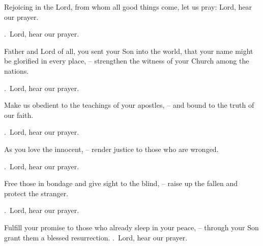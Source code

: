 \lettrine[loversize=0.15,lines=2]{R}{}ejoicing in the Lord, from whom all good things come, let us pray: Lord, hear our prayer.
\par \Rbar.~Lord, hear our prayer.

Father and Lord of all, you sent your Son into the world, that your name might be glorified in every place,
– strengthen the witness of your Church among the nations.
\par \Rbar.~Lord, hear our prayer.

Make us obedient to the teachings of your apostles,
– and bound to the truth of our faith.
\par \Rbar.~Lord, hear our prayer.

As you love the innocent,
– render justice to those who are wronged.
\par \Rbar.~Lord, hear our prayer.

Free those in bondage and give sight to the blind,
– raise up the fallen and protect the stranger.
\par \Rbar.~Lord, hear our prayer.

Fulfill your promise to those who already sleep in your peace,
– through your Son grant them a blessed resurrection.
\Rbar.~Lord, hear our prayer.
